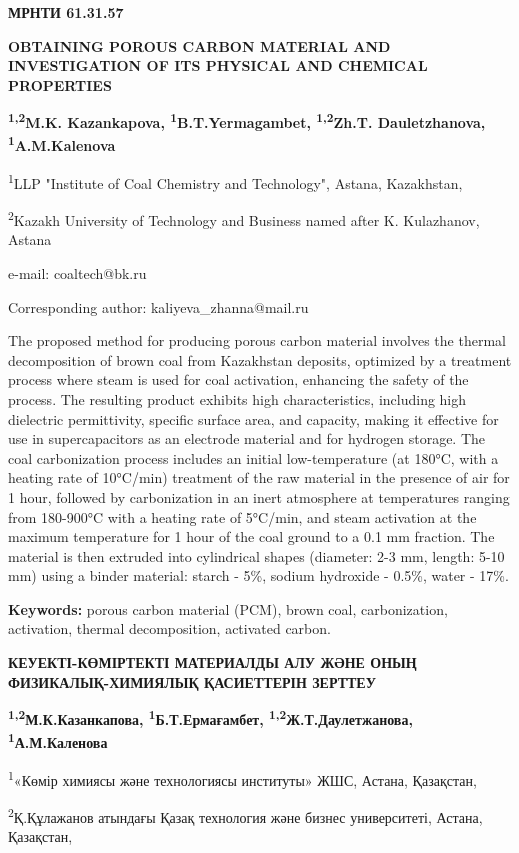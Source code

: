 \newpage
{\bfseries МРНТИ 61.31.57}

{\bfseries OBTAINING POROUS CARBON MATERIAL AND INVESTIGATION OF ITS
PHYSICAL AND CHEMICAL PROPERTIES}

{\bfseries \textsuperscript{1,2}M.K. Kazankapova,
\textsuperscript{1}B.T.Yermagambet, \textsuperscript{1,2}Zh.T.
Dauletzhanova, \textsuperscript{1}A.M.Kalenova}

\textsuperscript{1}LLP "Institute of Coal Chemistry and Technology",
Astana, Kazakhstan,

\textsuperscript{2}Kazakh University of Technology and Business named
after K. Kulazhanov, Astana

e-mail: coaltech@bk.ru

Corresponding author: kaliyeva\_zhanna@mail.ru

The proposed method for producing porous carbon material involves the
thermal decomposition of brown coal from Kazakhstan deposits, optimized
by a treatment process where steam is used for coal activation,
enhancing the safety of the process. The resulting product exhibits high
characteristics, including high dielectric permittivity, specific
surface area, and capacity, making it effective for use in
supercapacitors as an electrode material and for hydrogen storage. The
coal carbonization process includes an initial low-temperature (at
180°C, with a heating rate of 10°C/min) treatment of the raw material in
the presence of air for 1 hour, followed by carbonization in an inert
atmosphere at temperatures ranging from 180-900°C with a heating rate of
5°C/min, and steam activation at the maximum temperature for 1 hour of
the coal ground to a 0.1 mm fraction. The material is then extruded into
cylindrical shapes (diameter: 2-3 mm, length: 5-10 mm) using a binder
material: starch - 5\%, sodium hydroxide - 0.5\%, water - 17\%.

{\bfseries Keywords:} porous carbon material (PCM), brown coal,
carbonization, activation, thermal decomposition, activated carbon.

{\bfseries КЕУЕКТІ-КӨМІРТЕКТІ МАТЕРИАЛДЫ АЛУ ЖӘНЕ ОНЫҢ ФИЗИКАЛЫҚ-ХИМИЯЛЫҚ
ҚАСИЕТТЕРІН ЗЕРТТЕУ}

{\bfseries \textsuperscript{1,2}М.К.Казанкапова,
\textsuperscript{1}Б.Т.Ермағамбет,
\textsuperscript{1,2}Ж.Т.Даулетжанова, \textsuperscript{1}А.М.Каленова}

\textsuperscript{1}«Көмір химиясы және технологиясы институты» ЖШС,
Астана, Қазақстан,

\textsuperscript{2}Қ.Құлажанов атындағы Қазақ технология және бизнес
университеті, Астана, Қазақстан,

